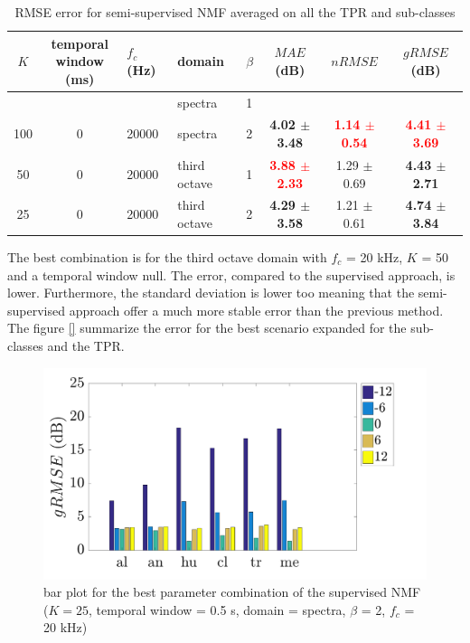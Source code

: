 \documentclass[twocolumn,a4paper,10pt]{article}
\begin{document}
\begin{table}
\centering
\begin{tabular}{cclllccc} 
$K$ & \shortstack{temporal\\window (ms)} & $f_c$ (Hz) & domain & $\beta$ & $MAE$ (dB) & $nRMSE$ & $gRMSE$ (dB) \\ 
\hline 
 &  &  & spectra & 1 &  &  &  \\ 
100 & 0 & 20000 & spectra & 2 & \textbf{4.02 $\pm$3.48} & \textbf{\textcolor{red}{1.14 $\pm$0.54}} & \textbf{\textcolor{red}{4.41 $\pm$3.69}} \\ 
50 & 0 & 20000 & third octave & 1 & \textbf{\textcolor{red}{3.88 $\pm$2.33}} & 1.29 $\pm$0.69 & \textbf{4.43 $\pm$2.71} \\ 
25 & 0 & 20000 & third octave & 2 & \textbf{4.29 $\pm$3.58} & 1.21 $\pm$0.61 & \textbf{4.74 $\pm$3.84} \\ 
\end{tabular} 
\caption{RMSE error for semi-supervised NMF averaged on all the TPR and sub-classes}
\label{tab:results_semi_supervised}
\end{table}

The best combination is for the third octave domain with $f_c$ = 20 kHz, $K$ = 50 and a temporal window null. The error,  compared to the supervised approach,  is lower. Furthermore, the standard deviation is lower too meaning that the semi-supervised approach offer a much more stable error than the previous method. The figure \ref{} summarize the error for the best scenario expanded for the sub-classes and the TPR. 

\begin{figure}[hbtp]
\centering
\includegraphics[width=\linewidth]{../image/nmfAmbianceBar.pdf}
\caption{bar plot for the best parameter combination of the supervised NMF ($K = 25$, temporal window = 0.5 s, domain = spectra, $\beta$ = 2, $f_c$ = 20 kHz)}
\label{fig:nmfSemiSupervisedAmbiance}
\end{figure}
\end{document}
